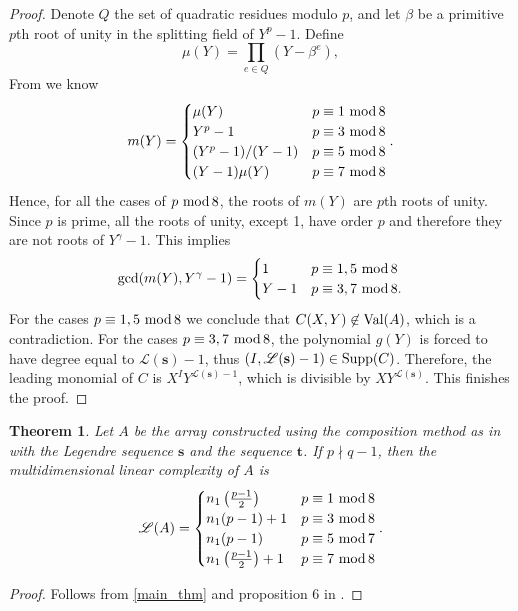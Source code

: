 \documentclass[12pt]{article}
\renewcommand{\mod}{\ \textup{mod}\,}
\newcommand{\supp}{\textup{Supp}}
\newcommand{\val}{\textup{Val}}
\newcommand{\legendre}{\mathscr{L}(\mathbf{s})}
\newtheorem{theorem}{Theorem}[section]
\theoremstyle{definition}
\theoremstyle{definition}
\theoremstyle{definition}
\theoremstyle{plain}
\theoremstyle{plain}
\numberwithin{equation}{section}
\begin{document}
\begin{proof}
    Denote $Q$ the set of quadratic residues modulo $p$, and let $\beta$ be a primitive $p$th root of unity in the splitting field of $Y^p-1$. 
    Define
    \[
        \mu(Y) = \prod_{e \in Q}(Y-\beta^e),
    \]
    From \cite{ding1998linear} we know
    \[
        m(Y) = \begin{cases}
        \mu(Y) & p \equiv 1 \mod 8\\
        Y^p-1 & p \equiv 3 \mod 8\\
        (Y^p-1)/(Y-1) & p \equiv 5 \mod 8\\
        (Y-1)\mu(Y) & p \equiv 7 \mod 8
        \end{cases}.
    \]
    Hence, for all the cases of $p \mod 8$, the roots of $m(Y)$ are $p$th roots of unity.
    Since $p$ is prime, all the roots of unity, except 1, have order $p$ and therefore they are not roots of $Y^\gamma-1$. 
    This implies 
     \[
        \gcd(m(Y), Y^\gamma-1) = \begin{cases}
            1 & p \equiv 1,5 \mod 8\\
            Y-1 & p \equiv 3,7 \mod 8.
        \end{cases}
    \]
    For the cases $p \equiv 1,5 \mod 8$ we conclude that $C(X,Y) \not\in \val(A)$, which is a contradiction. 
    For the cases $p \equiv 3,7 \mod 8$, the polynomial $g(Y)$ is forced to have degree equal to $\legendre-1$, thus $(I,\legendre-1)\in\supp(C)$. 
    Therefore, the leading monomial of $C$ is $X^I Y^{\legendre-1}$, which is divisible by $XY^{\legendre}$. 
    This finishes the proof.
\end{proof}


\begin{theorem}\label{The_Big_Thm}
Let $A$ be the array constructed using the composition method as in  with the Legendre sequence $\mathbf{s}$ and the sequence $\mathbf{t}$. 
If $p \nmid q-1$, then the multidimensional linear complexity of $A$ is
\[
    \mathscr{L}(A) = \begin{cases}
        n_1\left( \frac{p-1}{2} \right) & p\equiv 1 \mod 8\\
        n_1(p-1)+1 & p \equiv 3\mod 8\\
        n_1(p-1) & p \equiv 5 \mod 7\\
        n_1\left( \frac{p-1}{2} \right) + 1 & p \equiv 7 \mod 8
    \end{cases}.
\]
\end{theorem}
\begin{proof}
    Follows from \cref{main_thm} and proposition 6 in \cite{arce2019multidimensional}.
\end{proof}
\end{document}
